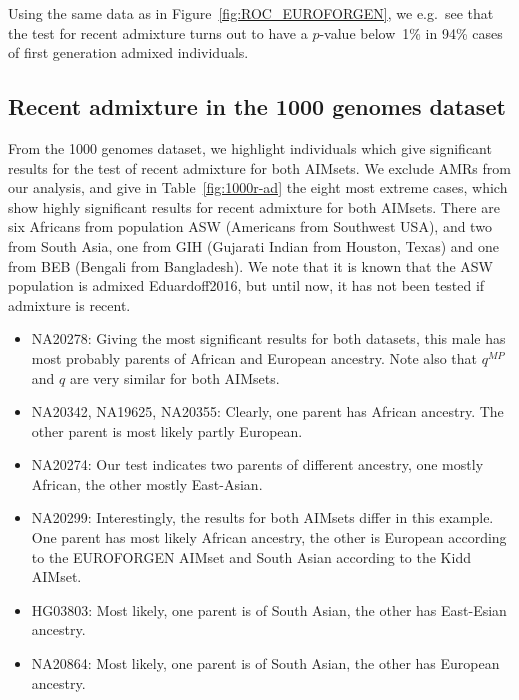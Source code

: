 \documentclass[12pt]{article}
\theoremstyle{definition}
\begin{document}
\begin{table}
  \centering
  
  \caption{Using the same data as in Figure~\ref{fig:ROC_EUROFORGEN},
    we e.g.\ see that the test for recent admixture turns out to have
    a $p$-value below~1\% in 94\% cases of first generation admixed
    individuals.}
  \label{tab:power}
\end{table}

\subsection{Recent admixture in the 1000 genomes dataset}
From the 1000 genomes dataset, we highlight individuals which give
significant results for the test of recent admixture for both
AIMsets. We exclude AMRs from our analysis, and give in
Table~\ref{fig:1000r-ad} the eight most extreme cases, which show
highly significant results for recent admixture for both
AIMsets. There are six Africans from population ASW (Americans from
Southwest USA), and two from South Asia, one from GIH (Gujarati Indian
from Houston, Texas) and one from BEB (Bengali from Bangladesh). We
note that it is known that the ASW population is admixed
\cite{article}{Eduardoff2016}, but until now, it has not been tested if
admixture is recent.

\begin{itemize}
\item NA20278: Giving the most significant results for both datasets,
  this male has most probably parents of African and European
  ancestry. Note also that $q^{MP}$ and $q$ are very similar for both
  AIMsets.
\item NA20342, NA19625, NA20355: Clearly, one parent has African
  ancestry. The other parent is most likely partly European.
\item NA20274: Our test indicates two parents of different ancestry,
  one mostly African, the other mostly East-Asian.
\item NA20299: Interestingly, the results for both AIMsets differ in
  this example. One parent has most likely African ancestry, the other
  is European according to the EUROFORGEN AIMset and South Asian
  according to the Kidd AIMset.
\item HG03803: Most likely, one parent is of South Asian, the other
  has East-Esian ancestry.
\item NA20864: Most likely, one parent is of South Asian, the other
  has European ancestry.
\end{itemize}
\end{document}
